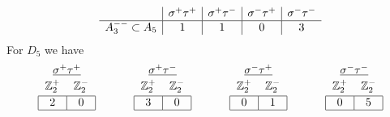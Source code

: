 \documentclass[11pt]{article}
\begin{document}
\begin{equation}\label{eq:a3-a5-func-counts}
\begin{array}{ l | c | c | c | c }      
  & \sigma^+\tau^+ & \sigma^+\tau^- & \sigma^-\tau^+ & \sigma^-\tau^- \\
  \hline
  A_3^{--}\subset A_5 & 1 & 1 & 0 & 3 
\end{array} 
\end{equation}
For $D_5$ we have
\begin{equation}
\begin{tabular}{| c | c |}
\multicolumn{2}{c}{$\underline{\sigma^+ \tau^+}$} \\[-1em]
\multicolumn{1}{c}{} & \multicolumn{1}{c}{} \\
\multicolumn{1}{c}{$\mathbb{Z}_2^+$} & \multicolumn{1}{c}{$\mathbb{Z}_2^-$} \\[-1em]
\multicolumn{1}{c}{} & \multicolumn{1}{c}{} \\
\hline
2 & 0 \\
\hline
\end{tabular} 
\hspace{1.2cm}
\begin{tabular}{| c | c |}
\multicolumn{2}{c}{$\underline{\sigma^+ \tau^-}$} \\[-1em]
\multicolumn{1}{c}{} & \multicolumn{1}{c}{} \\
\multicolumn{1}{c}{$\mathbb{Z}_2^+$} & \multicolumn{1}{c}{$\mathbb{Z}_2^-$} \\[-1em]
\multicolumn{1}{c}{} & \multicolumn{1}{c}{} \\
\hline
3 & 0 \\
\hline
\end{tabular} 
\hspace{1.2cm}
\begin{tabular}{| c | c |}
\multicolumn{2}{c}{$\underline{\sigma^- \tau^+}$} \\[-1em]
\multicolumn{1}{c}{} & \multicolumn{1}{c}{} \\
\multicolumn{1}{c}{$\mathbb{Z}_2^+$} & \multicolumn{1}{c}{$\mathbb{Z}_2^-$} \\[-1em]
\multicolumn{1}{c}{} & \multicolumn{1}{c}{} \\
\hline
0 & 1 \\
\hline
\end{tabular} 
\hspace{1.2cm}
\begin{tabular}{| c | c |}
\multicolumn{2}{c}{$\underline{\sigma^- \tau^-}$} \\[-1em]
\multicolumn{1}{c}{} & \multicolumn{1}{c}{} \\
\multicolumn{1}{c}{$\mathbb{Z}_2^+$} & \multicolumn{1}{c}{$\mathbb{Z}_2^-$} \\[-1em]
\multicolumn{1}{c}{} & \multicolumn{1}{c}{} \\
\hline
0 & 5 \\
\hline
\end{tabular} 
\end{equation}
\end{document}
